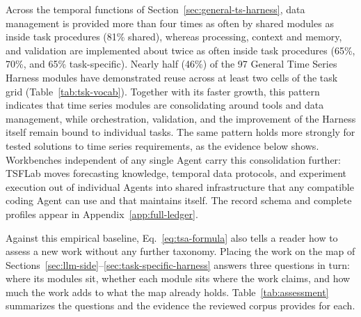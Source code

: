 \documentclass[preprints,article,submit,moreauthors]{Definitions/mdpi}
\begin{document}
Across the temporal functions of Section~\ref{sec:general-ts-harness}, data management is provided more than four times as often by shared modules as inside task procedures (81\% shared), whereas processing, context and memory, and validation are implemented about twice as often inside task procedures (65\%, 70\%, and 65\% task-specific). Nearly half (46\%) of the 97 General Time Series Harness modules have demonstrated reuse across at least two cells of the task grid (Table~\ref{tab:tsk-vocab}). Together with its faster growth, this pattern indicates that time series modules are consolidating around tools and data management, while orchestration, validation, and the improvement of the Harness itself remain bound to individual tasks. The same pattern holds more strongly for tested solutions to time series requirements, as the evidence below shows. Workbenches independent of any single Agent carry this consolidation further: TSFLab \citep{tsflab2026} moves forecasting knowledge, temporal data protocols, and experiment execution out of individual Agents into shared infrastructure that any compatible coding Agent can use and that maintains itself. The record schema and complete profiles appear in Appendix~\ref{app:full-ledger}.

Against this empirical baseline, Eq.~\eqref{eq:tsa-formula} also tells a reader how to assess a new work without any further taxonomy. Placing the work on the map of Sections~\ref{sec:llm-side}--\ref{sec:task-specific-harness} answers three questions in turn: where its modules sit, whether each module sits where the work claims, and how much the work adds to what the map already holds. Table~\ref{tab:assessment} summarizes the questions and the evidence the reviewed corpus provides for each.
\end{document}
